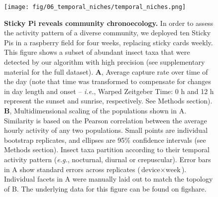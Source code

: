 \documentclass[12pt]{article}
\begin{document}
	\pagebreak
	
	\begin{figure}[ht]
		\centering
		\texttt{[image: fig/06\_temporal\_niches/temporal\_niches.png]}
		\caption{\textbf{Sticky Pi reveals community chronoecology.} In order to assess the activity pattern of a diverse community, we deployed ten Sticky Pis in a raspberry field for four weeks, replacing sticky cards weekly. This figure shows a subset of abundant insect taxa that were detected by our algorithm with high precision (see supplementary material for the full dataset). \textbf{A}, Average capture rate over time of the day (note that time was transformed to compensate for changes in day length and onset – \emph{i.e.}, Warped Zeitgeber Time: 0 h and 12 h represent the sunset and sunrise, respectively. See Methods section). \textbf{B}, Multidimensional scaling of the populations shown in A. Similarity is based on the Pearson correlation between the average hourly activity of any two populations. Small points are individual bootstrap replicates, and ellipses are 95\% confidence intervals (see Methods section). Insect taxa partition according to their temporal activity pattern (\emph{e.g.}, nocturnal, diurnal or crepuscular). Error bars in A show standard errors across replicates ($\text{device} \times{} \text{week}$). Individual facets in A were manually laid out to match the topology of B.
        The underlying data for this figure can be found on figshare\cite{noauthor_datasets_2022}.}
		\label{fig:06}
	\end{figure}
	\pagebreak
	
	\clearpage
	\newpage
	
	\begin{supfig}[ht]
		\centering
		\caption{\textbf{The Sticky Pi platform.} Sticky Pi devices acquire images that are retrieved using a “data harvester” – based on another Raspberry Pi. The data from the harvesters are then incrementally uploaded to a centralised, per-laboratory, database. Images are then automatically pre-processed (the Universal Insect Detector is applied). Users and maintainers can visualise data in real-time using our Rshiny web application. The remote Application Programming Interface (API) is secured behind an Nginx server, and the images are saved on an S3 server. All components of the server are deployed as individual interacting Docker containers. API documentation and source code are available on \href{https://doc.sticky-pi.com/web-server.html}{https://doc.sticky-pi.com/web-server.html}.}
		\label{supfig:01}
	\end{supfig}
	
\end{document}
